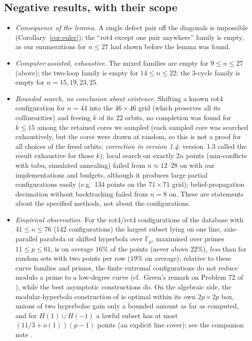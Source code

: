 \documentclass[11pt]{article}
\theoremstyle{remark}
\begin{document}
\subsection{Negative results, with their scope}
\begin{itemize}
\item \emph{Consequence of the lemma.}  A single defect pair off the diagonals is impossible (Corollary~\ref{cor:euler}); the
``rot4 except one pair anywhere'' family is empty, as our enumerations for $n\le 27$ had shown before the lemma was found.
\item \emph{Computer-assisted, exhaustive.}  The mixed families are empty for $9\le n\le27$ (above); the two-loop family is
empty for $14\le n\le22$; the $3$-cycle family is empty for $n=15,19,23,25$.
\item \emph{Bounded search, no conclusion about existence.}  Shifting a known rot4 configuration for $n=44$ into the
$46\times46$ grid (which preserves all its collinearities) and freeing $k$ of its $22$ orbits, no completion was found for
$k\le15$ among the retained cores we sampled (each sampled core was searched exhaustively, but the
cores were drawn at random, so this is not a proof for all choices of the freed orbits;
\emph{correction in version 1.4}: version~1.3 called the result exhaustive for those $k$); local search on exactly $2n$ points (min-conflicts with tabu, simulated annealing) failed
from $n\approx12$--$28$ on with our implementations and budgets, although it produces large partial configurations easily
(e.g.\ 134 points on the $71\times71$ grid); belief-propagation decimation without backtracking failed from $n=8$ on.  These
are statements about the specified methods, not about the configurations.
\item \emph{Empirical observation.}  For the rot4/rct4 configurations of the database with $41\le n\le76$ (142
configurations) the largest subset lying on one line, axis-parallel parabola or shifted hyperbola over $\mathbb F_p$,
maximised over primes $11\le p\le61$, is on average $16\%$ of the points (never above $22\%$), \emph{less} than for random
sets with two points per row ($19\%$ on average): relative to these curve families and primes, the finite extremal
configurations do not reduce modulo a prime to a low-degree curve (cf.\ Green's remark on Problem 72 of \cite{Green}), while
the best asymptotic constructions do.  On the algebraic side, the modular-hyperbola construction of \cite{HJSW75} is optimal
within its own $2p\times2p$ box, unions of two hyperbolae gain only a bounded amount as far as computed, and for $H(1)\cup H(-1)$ a lawful
subset has at most $(11/3+o(1))(p-1)$ points (an explicit line cover); see the companion note \cite{Companion}.
\end{itemize}
\end{document}
